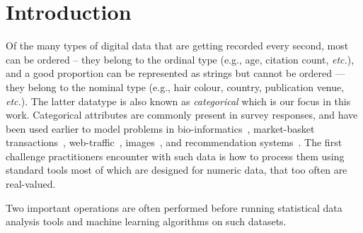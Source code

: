 
\section{Introduction}
Of the many types of digital data that are getting recorded every second, %
most can be ordered -- they belong to the ordinal type (e.g., age, citation count, {\it etc.}), and a good proportion can be represented as strings but cannot be ordered --- they belong to the nominal type (e.g., hair colour, country, publication venue, {\it etc.}). The latter datatype is also known as {\em categorical} which is our focus in this work. Categorical attributes are commonly present in survey responses, and have been used earlier to model problems in bio-informatics~\cite{DNA,HIV}, market-basket transactions~\cite{transaction,itemset_categorical,itemset_mining}, web-traffic~\cite{web_transaction}, images~\cite{image_categorical}, and recommendation systems~\cite{click_stream}. The first challenge practitioners encounter with such data is how to process them using standard tools most of which are designed for numeric data, that too often are real-valued.

Two important operations are often performed before running statistical data analysis tools and machine learning algorithms on such datasets. 

